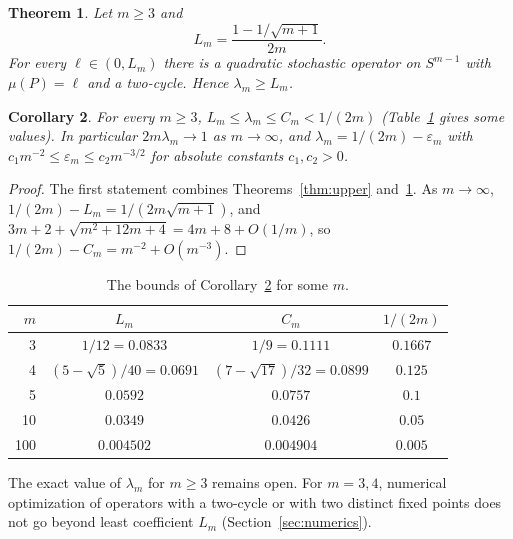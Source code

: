\documentclass[11pt]{amsart}
\newtheorem{theorem}{Theorem}[section]
\newtheorem{corollary}[theorem]{Corollary}
\theoremstyle{definition}
\theoremstyle{remark}
\begin{document}
\begin{theorem}\label{thm:lower}
Let $m\ge3$ and
\[
L_m=\frac{1-1/\sqrt{m+1}}{2m}.
\]
For every $\ell\in(0,L_m)$ there is a quadratic stochastic operator on $S^{m-1}$ with $\mu(P)=\ell$ and a two-cycle.
Hence $\lambda_m\ge L_m$.
\end{theorem}

\begin{corollary}\label{cor:asym}
For every $m\ge3$, $L_m\le\lambda_m\le C_m<1/(2m)$ (Table~\ref{tab:bounds} gives some values). In particular $2m\lambda_m\to1$ as $m\to\infty$, and
$\lambda_m=1/(2m)-\varepsilon_m$ with $c_1m^{-2}\le\varepsilon_m\le c_2m^{-3/2}$ for absolute constants
$c_1,c_2>0$.
\end{corollary}

\begin{proof}
The first statement combines Theorems~\ref{thm:upper} and~\ref{thm:lower}. As $m\to\infty$,
$1/(2m)-L_m=1/(2m\sqrt{m+1})$, and $3m+2+\sqrt{m^2+12m+4}=4m+8+O(1/m)$, so $1/(2m)-C_m=m^{-2}+O(m^{-3})$.
\end{proof}

\begin{table}[tbp]
\centering
\begin{tabular}{rccc}
\toprule
$m$ & $L_m$ & $C_m$ & $1/(2m)$\\
\midrule
3 & $1/12=0.0833$ & $1/9=0.1111$ & $0.1667$\\
4 & $(5-\sqrt5)/40=0.0691$ & $(7-\sqrt{17})/32=0.0899$ & $0.125$\\
5 & $0.0592$ & $0.0757$ & $0.1$\\
10 & $0.0349$ & $0.0426$ & $0.05$\\
100 & $0.004502$ & $0.004904$ & $0.005$\\
\bottomrule
\end{tabular}
\caption{The bounds of Corollary~\ref{cor:asym} for some $m$.}\label{tab:bounds}
\end{table}

The exact value of $\lambda_m$ for $m\ge3$ remains open. For $m=3,4$, numerical optimization of operators with a
two-cycle or with two distinct fixed points does not go beyond least coefficient $L_m$ (Section~\ref{sec:numerics}).
\end{document}
